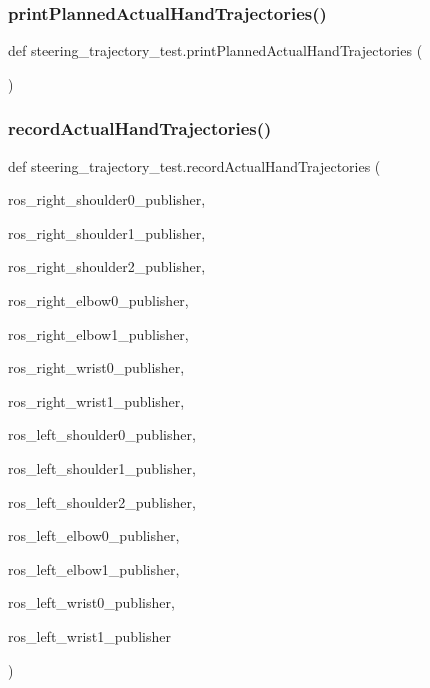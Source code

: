 \subsubsection{\texorpdfstring{printPlannedActualHandTrajectories()}{printPlannedActualHandTrajectories()}}
{\footnotesize\ttfamily def steering\+\_\+trajectory\+\_\+test.\+print\+Planned\+Actual\+Hand\+Trajectories (\begin{DoxyParamCaption}{ }\end{DoxyParamCaption})}

\mbox{\label{namespacesteering__trajectory__test_a74f9ef301e8dff3fd088529eca18d365}} 
\subsubsection{\texorpdfstring{recordActualHandTrajectories()}{recordActualHandTrajectories()}}
{\footnotesize\ttfamily def steering\+\_\+trajectory\+\_\+test.\+record\+Actual\+Hand\+Trajectories (\begin{DoxyParamCaption}\item[{}]{ros\+\_\+right\+\_\+shoulder0\+\_\+publisher,  }\item[{}]{ros\+\_\+right\+\_\+shoulder1\+\_\+publisher,  }\item[{}]{ros\+\_\+right\+\_\+shoulder2\+\_\+publisher,  }\item[{}]{ros\+\_\+right\+\_\+elbow0\+\_\+publisher,  }\item[{}]{ros\+\_\+right\+\_\+elbow1\+\_\+publisher,  }\item[{}]{ros\+\_\+right\+\_\+wrist0\+\_\+publisher,  }\item[{}]{ros\+\_\+right\+\_\+wrist1\+\_\+publisher,  }\item[{}]{ros\+\_\+left\+\_\+shoulder0\+\_\+publisher,  }\item[{}]{ros\+\_\+left\+\_\+shoulder1\+\_\+publisher,  }\item[{}]{ros\+\_\+left\+\_\+shoulder2\+\_\+publisher,  }\item[{}]{ros\+\_\+left\+\_\+elbow0\+\_\+publisher,  }\item[{}]{ros\+\_\+left\+\_\+elbow1\+\_\+publisher,  }\item[{}]{ros\+\_\+left\+\_\+wrist0\+\_\+publisher,  }\item[{}]{ros\+\_\+left\+\_\+wrist1\+\_\+publisher }\end{DoxyParamCaption})}

